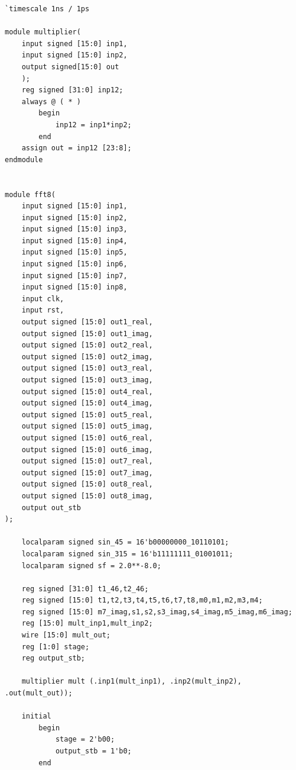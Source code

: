 \documentclass{article}
\begin{document}
\begin{lstlisting}[style={verilog-style}]
`timescale 1ns / 1ps

module multiplier(
    input signed [15:0] inp1,
    input signed [15:0] inp2,
    output signed[15:0] out
    );
	reg signed [31:0] inp12;
	always @ ( * )
		begin
			inp12 = inp1*inp2;
		end
	assign out = inp12 [23:8];
endmodule


module fft8(
	input signed [15:0] inp1,
	input signed [15:0] inp2,
	input signed [15:0] inp3,
	input signed [15:0] inp4,
	input signed [15:0] inp5,
	input signed [15:0] inp6,
	input signed [15:0] inp7,
	input signed [15:0] inp8,
	input clk,
	input rst,
	output signed [15:0] out1_real,
	output signed [15:0] out1_imag,
	output signed [15:0] out2_real,
	output signed [15:0] out2_imag,
	output signed [15:0] out3_real,
	output signed [15:0] out3_imag,
	output signed [15:0] out4_real,
	output signed [15:0] out4_imag,
	output signed [15:0] out5_real,
	output signed [15:0] out5_imag,
	output signed [15:0] out6_real,
	output signed [15:0] out6_imag,
	output signed [15:0] out7_real,
	output signed [15:0] out7_imag,
	output signed [15:0] out8_real,
	output signed [15:0] out8_imag,
	output out_stb
);
	
	localparam signed sin_45 = 16'b00000000_10110101;
	localparam signed sin_315 = 16'b11111111_01001011;
	localparam signed sf = 2.0**-8.0;

	reg signed [31:0] t1_46,t2_46; 
	reg signed [15:0] t1,t2,t3,t4,t5,t6,t7,t8,m0,m1,m2,m3,m4;
	reg signed [15:0] m7_imag,s1,s2,s3_imag,s4_imag,m5_imag,m6_imag;
	reg [15:0] mult_inp1,mult_inp2;
	wire [15:0] mult_out;
	reg [1:0] stage;
	reg output_stb;

	multiplier mult (.inp1(mult_inp1), .inp2(mult_inp2), .out(mult_out));

	initial
		begin
			stage = 2'b00;
			output_stb = 1'b0;
		end


\end{lstlisting}
\end{document}
